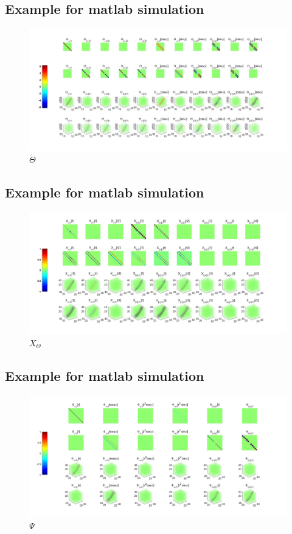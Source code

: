 \documentclass{Note}
\begin{document}
\subsection{Example for matlab simulation}
\begin{figure}
  \centerline{\includegraphics[width=8in]{ThetaFun.jpg}}
  \caption{$\Theta$}
  \end{figure}
  
  
  \subsection{Example for matlab simulation}
\begin{figure}
  \centerline{\includegraphics[width=8in]{XFun.jpg}}
  \caption{$X_ \Theta$}
  \end{figure}


  
  \subsection{Example for matlab simulation}
\begin{figure}
  \centerline{\includegraphics[width=8in]{PsiFun.jpg}}
  \caption{$\Psi$}
  \end{figure}
\end{document}
